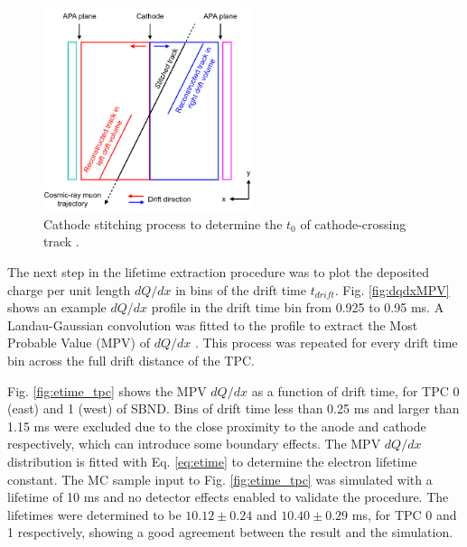 \begin{figure}[h!] 
\centering    
\includegraphics[width=0.55\textwidth]{cosmic_stitch}
\caption[Cathode Stitching Diagram]{
Cathode stitching process to determine the $t_{0}$ of cathode-crossing track \cite{pandora_protodune}.
}
\label{fig:cosmic_stitch}
\end{figure}

The next step in the lifetime extraction procedure was to plot the deposited charge per unit length $dQ/dx$ in bins of the drift time $t_{drift}$.
Fig. \ref{fig:dqdxMPV} shows an example $dQ/dx$ profile in the drift time bin from 0.925 to 0.95 ms.
A Landau-Gaussian convolution was fitted to the profile to extract the Most Probable Value (MPV) of $dQ/dx$ \cite{Passage}.
This process was repeated for every drift time bin across the full drift distance of the TPC.

Fig. \ref{fig:etime_tpc} shows the MPV $dQ/dx$ as a function of drift time, for TPC 0 (east) and 1 (west) of SBND.
Bins of drift time less than 0.25 ms and larger than 1.15 ms were excluded due to the close proximity to the anode and cathode respectively, which can introduce some boundary effects.
The MPV $dQ/dx$ distribution is fitted with Eq. \ref{eq:etime} to determine the electron lifetime constant.
The MC sample input to Fig. \ref{fig:etime_tpc} was simulated with a lifetime of 10 ms and no detector effects enabled to validate the procedure.                                       
The lifetimes were determined to be $10.12\pm0.24$ and $10.40\pm0.29$ ms, for TPC 0 and 1 respectively, showing a good agreement between the result and the simulation. 

